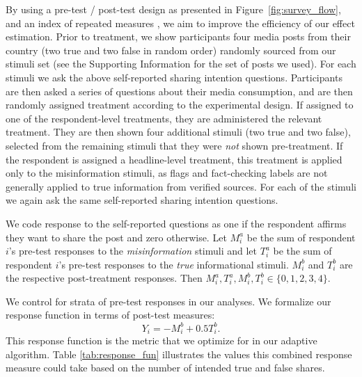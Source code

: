 \documentclass[letterpaper, 12pt, parskip=full,DIV=10]{scrartcl}
\begin{document}
By using a pre-test / post-test design \citep{davidian2005semiparametric} as presented in Figure~\ref{fig:survey_flow}, and an index of repeated measures \citep{broockman2017design}, we aim to improve the efficiency of our effect estimation. Prior to treatment, we show participants four media posts from their country (two true and two false in random order) randomly sourced from our stimuli set (see the Supporting Information for the set of posts we used). For each stimuli we ask the above self-reported sharing intention questions.  Participants are then asked a series of questions about their media consumption, and are then randomly assigned treatment according to the experimental design. If assigned to one of the respondent-level treatments, they are administered the relevant treatment. They are then shown four additional stimuli (two true and two false), selected from the remaining stimuli that they were \textit{not} shown pre-treatment. If the respondent is assigned a headline-level treatment, this treatment is applied only to the misinformation stimuli, as flags and fact-checking labels are not generally applied to true information from verified sources. For each of the stimuli we again ask the same self-reported sharing intention questions. 


We code response to the self-reported questions as one if the respondent affirms they want to share the post and zero otherwise. Let $M_i^a$ be the sum of respondent $i$'s pre-test responses to the \textit{misinformation} stimuli and let $T_i^a$ be the sum of respondent $i$'s pre-test responses to the \textit{true} informational stimuli. $M_i^b$ and $T_i^b$ are the respective post-treatment responses. Then $M_i^a, T_i^a, M_i^b, T_i^b \in \{0,1,2, 3, 4\}$. 

We control for strata of pre-test responses in our analyses. We formalize our response function in terms of post-test measures:
\[
Y_i = -M^b_i + 0.5 T^b_i.
\]
This response function is the metric that we optimize for in our adaptive algorithm. Table \ref{tab:response_fun} illustrates the values this combined response measure could take based on the number of intended true and false shares.
\end{document}
